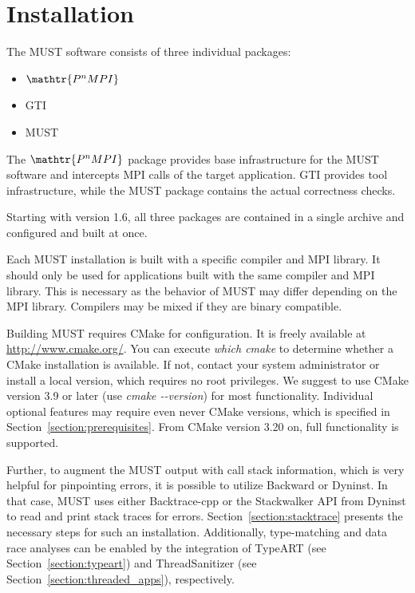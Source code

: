 \documentclass[english]{scrartcl}
\newcommand{\pnmpi}{$\mathop{\mathtr{P^nMPI}}\nolimits$\xspace}
\begin{document}
\section{Installation}

The MUST software consists of three individual packages:
\begin{itemize}
  \item \pnmpi
  \item GTI
  \item MUST
\end{itemize}

The \pnmpi package provides base infrastructure for the MUST software and
intercepts MPI calls of the target application. GTI provides tool
infrastructure, while the MUST package contains the actual correctness checks.

Starting with version 1.6, all three packages are contained in a single archive and configured and built at once.

Each MUST installation is built with a specific compiler and MPI library. It
should only be used for applications built with the same compiler and MPI library. This is necessary as the behavior of MUST may differ
depending on the MPI library. Compilers may be mixed if they are binary
compatible.

Building MUST requires CMake for configuration. It is freely available at
\url{http://www.cmake.org/}. You can execute \emph{which cmake} to determine
whether a CMake installation is available. If not, contact your system
administrator or install a local version, which requires no root
privileges. We suggest to use CMake version 3.9 or later 
(use \emph{cmake \mbox{-{}-}version}) for most functionality.
Individual optional features may require even never CMake versions, which is specified in Section~\ref{section:prerequisites}.
From CMake version 3.20 on, full functionality is supported.

Further, to augment the MUST output with call stack information, which
is very helpful for pinpointing errors, it is possible to utilize Backward or Dyninst. In
that case, MUST uses either Backtrace-cpp or the Stackwalker API from Dyninst to read and print stack traces for errors.
Section~\ref{section:stacktrace} presents the necessary steps for such an
installation.
Additionally, type-matching and data race analyses can be enabled by the integration of TypeART (see Section~\ref{section:typeart}) and ThreadSanitizer (see Section~\ref{section:threaded_apps}), respectively.
\end{document}
